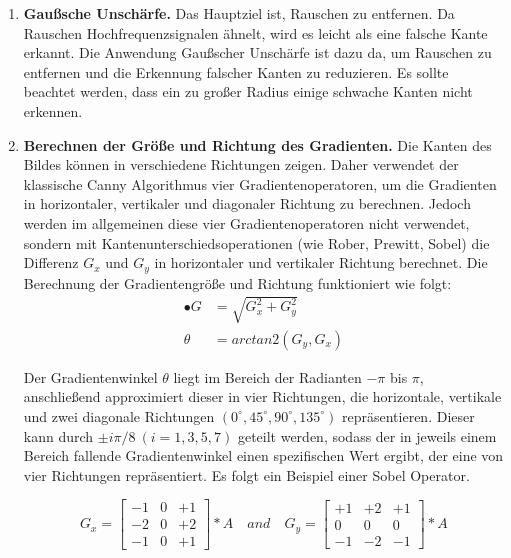 \begin{enumerate}
	\item \textbf{Gaußsche Unschärfe.} Das Hauptziel ist, Rauschen zu entfernen. Da Rauschen Hochfrequenzsignalen ähnelt, wird es leicht als eine falsche Kante erkannt. Die Anwendung Gaußscher Unschärfe ist dazu da, um Rauschen zu entfernen und die Erkennung falscher Kanten zu reduzieren. Es sollte beachtet werden, dass ein zu großer Radius einige schwache Kanten nicht erkennen.
	\item \textbf{Berechnen der Größe und Richtung des Gradienten.} Die Kanten des Bildes können in verschiedene Richtungen zeigen. Daher verwendet der klassische Canny Algorithmus vier Gradientenoperatoren, um die Gradienten in horizontaler, vertikaler und diagonaler Richtung zu berechnen. Jedoch werden im allgemeinen diese vier Gradientenoperatoren nicht verwendet, sondern mit Kantenunterschiedsoperationen (wie Rober, Prewitt, Sobel) die Differenz $ G_x $ und $ G_y $ in horizontaler und vertikaler Richtung berechnet. Die Berechnung der Gradientengröße und Richtung funktioniert wie folgt:	
\begin{equation}
\begin{split}
•  G   & = \sqrt{G_x^{2} + G_y^{2}} \\
\theta & = arctan2(G_y,G_x)
\end{split}
\end{equation}

Der Gradientenwinkel $ \theta $ liegt im Bereich der Radianten $ -\pi $ bis $ \pi $, anschließend approximiert dieser in vier Richtungen, die horizontale, vertikale und zwei diagonale Richtungen $(0^{\circ}, 45^{\circ}, 90^{\circ}, 135^{\circ}) $ repräsentieren. Dieser kann durch $  \pm i \pi / 8\ (i =1, 3, 5, 7) $ geteilt werden, sodass der in jeweils einem Bereich fallende Gradientenwinkel einen spezifischen Wert ergibt, der eine von vier Richtungen repräsentiert. Es folgt ein Beispiel einer Sobel Operator.

\begin{equation}
G_x = \begin{bmatrix}
-1 &0 &+1 \\
-2 &0 &+2 \\
-1 &0 &+1
\end{bmatrix} * A \quad and \quad G_y = \begin{bmatrix}
+1 &+2 &+1 \\
0 &0 &0 \\
-1 &-2 &-1
\end{bmatrix} * A
\end{equation}
	

\end{enumerate}
